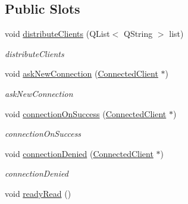 \subsection*{Public Slots}
\begin{DoxyCompactItemize}
\item 
void \hyperlink{classPenguinServer_1_1ServerThread_a5505bcb3b0bb4483859c59c38636585c}{distribute\-Clients} (Q\-List$<$ Q\-String $>$ list)
\begin{DoxyCompactList}\small\item\em distribute\-Clients \end{DoxyCompactList}\item 
\hypertarget{classPenguinServer_1_1ServerThread_a7f1c00042c85effe5d3e60b102d154ec}{void \hyperlink{classPenguinServer_1_1ServerThread_a7f1c00042c85effe5d3e60b102d154ec}{ask\-New\-Connection} (\hyperlink{classPenguinServer_1_1ConnectedClient}{Connected\-Client} $\ast$)}\label{classPenguinServer_1_1ServerThread_a7f1c00042c85effe5d3e60b102d154ec}

\begin{DoxyCompactList}\small\item\em ask\-New\-Connection \end{DoxyCompactList}\item 
\hypertarget{classPenguinServer_1_1ServerThread_ad6c087d78aa5dd7ed110be45a0c7b446}{void \hyperlink{classPenguinServer_1_1ServerThread_ad6c087d78aa5dd7ed110be45a0c7b446}{connection\-On\-Success} (\hyperlink{classPenguinServer_1_1ConnectedClient}{Connected\-Client} $\ast$)}\label{classPenguinServer_1_1ServerThread_ad6c087d78aa5dd7ed110be45a0c7b446}

\begin{DoxyCompactList}\small\item\em connection\-On\-Success \end{DoxyCompactList}\item 
\hypertarget{classPenguinServer_1_1ServerThread_afe59ece0b17da4749e342ec14c7891c4}{void \hyperlink{classPenguinServer_1_1ServerThread_afe59ece0b17da4749e342ec14c7891c4}{connection\-Denied} (\hyperlink{classPenguinServer_1_1ConnectedClient}{Connected\-Client} $\ast$)}\label{classPenguinServer_1_1ServerThread_afe59ece0b17da4749e342ec14c7891c4}

\begin{DoxyCompactList}\small\item\em connection\-Denied \end{DoxyCompactList}\item 
\hypertarget{classPenguinServer_1_1ServerThread_aab8eccde8e140e9ba81c7b566208f8de}{void \hyperlink{classPenguinServer_1_1ServerThread_aab8eccde8e140e9ba81c7b566208f8de}{ready\-Read} ()}\label{classPenguinServer_1_1ServerThread_aab8eccde8e140e9ba81c7b566208f8de}


\end{DoxyCompactItemize}
